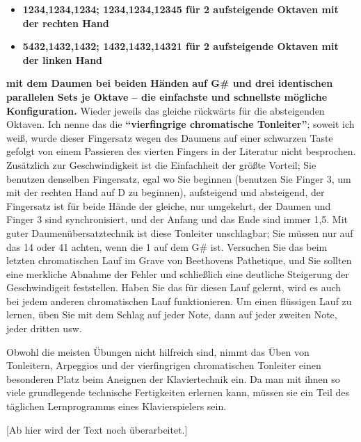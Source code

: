 \begin{itemize} 
 \item \textbf{1234,1234,1234; 1234,1234,12345 für 2 aufsteigende Oktaven mit der rechten Hand}
 \item \textbf{5432,1432,1432; 1432,1432,14321 für 2 aufsteigende Oktaven mit der linken Hand}
 \end{itemize}
\textbf{mit dem Daumen bei beiden Händen auf G\# und drei identischen parallelen Sets je Oktave -- die einfachste und schnellste mögliche Konfiguration.}
Wieder jeweils das gleiche rückwärts für die absteigenden Oktaven.
Ich nenne das die \textbf{\enquote{vierfingrige chromatische Tonleiter}}; soweit ich weiß, wurde dieser Fingersatz wegen des Daumens auf einer schwarzen Taste gefolgt von einem Passieren des vierten Fingers in der Literatur nicht besprochen.
Zusätzlich zur Geschwindigkeit ist die Einfachheit der größte Vorteil; Sie benutzen denselben Fingersatz, egal wo Sie beginnen (benutzen Sie Finger 3, um mit der rechten Hand auf D zu beginnen), aufsteigend und absteigend, der Fingersatz ist für beide Hände der gleiche, nur umgekehrt, der Daumen und Finger 3 sind synchronisiert, und der Anfang und das Ende sind immer 1,5.  
Mit guter Daumenübersatztechnik ist diese Tonleiter unschlagbar; Sie müssen nur auf das 14 oder 41 achten, wenn die 1 auf dem G\# ist.
Versuchen Sie das beim letzten chromatischen Lauf im Grave von Beethovens Pathetique, und Sie sollten eine merkliche Abnahme der Fehler und schließlich eine deutliche Steigerung der Geschwindigeit feststellen.
Haben Sie das für diesen Lauf gelernt, wird es auch bei jedem anderen chromatischen Lauf funktionieren.
Um einen flüssigen Lauf zu lernen, üben Sie mit dem Schlag auf jeder Note, dann auf jeder zweiten Note, jeder dritten usw.

Obwohl die meisten Übungen nicht hilfreich sind, nimmt das Üben von Tonleitern, Arpeggios und der vierfingrigen chromatischen Tonleiter einen besonderen Platz beim Aneignen der Klaviertechnik ein.
Da man mit ihnen so viele grundlegende technische Fertigkeiten erlernen kann, müssen sie ein Teil des täglichen Lernprogramms eines Klavierspielers sein.


[Ab hier wird der Text noch überarbeitet.]




